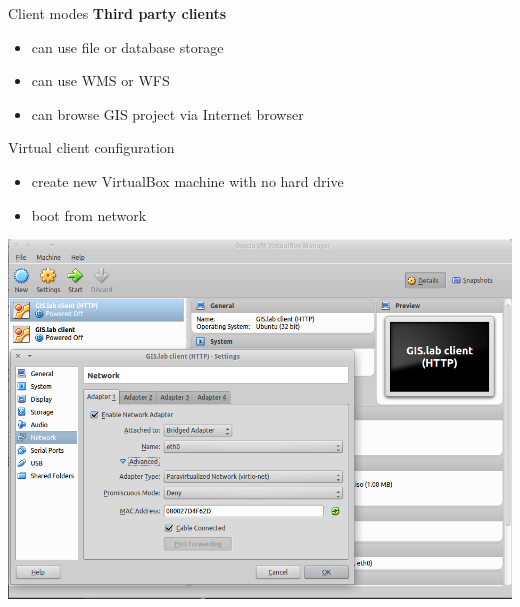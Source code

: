 \documentclass[12pt]{beamer}
\begin{document}
\begin{frame}{Client modes}
	\textbf{Third party clients}
	\begin{itemize}
		\item can use file or database storage
		\item can use WMS or WFS 
		\item can browse GIS project via Internet browser
	\end{itemize}
\end{frame}


\begin{frame}{Virtual client configuration}
	\begin{itemize}
		\item create new VirtualBox machine with no hard drive
		\item boot from network
	\end{itemize}
	\begin{center}
		\includegraphics[keepaspectratio=true,height=0.6\textheight]{images/real-world-example/client-virtualbox-configuration.png}
	\end{center}
\end{frame}
\end{document}
